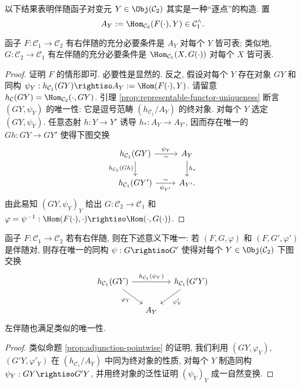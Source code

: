 以下结果表明伴随函子对变元 $Y \in \Obj(\mathcal{C}_2)$ 其实是一种``逐点''的构造. 置
\[ A_Y := \Hom_{\mathcal{C}_2}(F(\cdot), Y) \in \mathcal{C}_1^\wedge. \]

\begin{proposition}\label{prop:adjunction-pointwise}
	函子 $F: \mathcal{C}_1 \to \mathcal{C}_2$ 有右伴随的充分必要条件是 $A_Y$ 对每个 $Y$ 皆可表; 类似地, $G: \mathcal{C}_2 \to \mathcal{C}_1$ 有左伴随的充分必要条件是 $\Hom_{\mathcal{C}_1}(X, G(\cdot))$ 对每个 $X$ 皆可表.
\end{proposition}
\begin{proof}
	证明 $F$ 的情形即可. 必要性是显然的. 反之, 假设对每个 $Y$ 存在对象 $GY$ 和同构 $\psi_Y: h_{\mathcal{C}_1}(GY) \rightiso A_Y := \Hom(F(\cdot), Y)$.  请留意 $h_{\mathcal{C}}(GY) = \Hom_{\mathcal{C}_2}(\cdot, GY)$. 引理 \ref{prop:representable-functor-uniqueness} 断言 $(GY, \psi_Y)$ 的唯一性: 它是逗号范畴 $(h_{\mathcal{C}_1} / A_Y)$ 的终对象. 对每个 $Y$ 选定 $(GY, \psi_Y)$. 任意态射 $h: Y \to Y'$ 诱导 $h_*: A_Y \to A_{Y'}$, 因而存在唯一的 $Gh: GY \to GY'$ 使得下图交换
	\[ \begin{tikzcd}
		h_{\mathcal{C}_1}(GY) \arrow[d, "{h_{\mathcal{C}_1}(Gh)}"'] \arrow[r, "\psi_Y", "\sim"'] & A_Y \arrow[d, "h_*"] \\
		h_{\mathcal{C}_1}(GY') \arrow[r, "{\psi_{Y'}}"', "\sim"] & A_{Y'} .
	\end{tikzcd} \]
	由此易知 $(GY, \psi_Y)_Y$ 给出 $G: \mathcal{C}_2 \to \mathcal{C}_1$ 和 $\varphi = \psi^{-1}: \Hom(F(\cdot), \cdot) \rightiso \Hom(\cdot, G(\cdot))$.
\end{proof}

\begin{proposition}\label{prop:adjunction-uniqueness}
	函子 $F: \mathcal{C}_1 \to \mathcal{C}_2$ 若有右伴随, 则在下述意义下唯一: 若 $(F, G, \varphi)$ 和 $(F, G', \varphi')$ 是伴随对, 则存在唯一的同构 $\psi: G \rightiso G'$ 使得对每个 $Y \in \Obj(\mathcal{C}_2)$ 下图交换
	\[ \begin{tikzcd}[column sep=small]
		h_{\mathcal{C}_1}(GY) \arrow[rr, "{h_{\mathcal{C}_1}(\psi_Y)}"] \arrow[rd, "\varphi_Y"'] & & h_{\mathcal{C}_1}(G'Y) \arrow[ld, "{{\varphi}'_Y}"] \\
		& A_Y &
	\end{tikzcd} \]
	左伴随也满足类似的唯一性.
\end{proposition}
\begin{proof}
	类似命题 \ref{prop:adjunction-pointwise} 的证明, 我们利用 $(GY, \varphi_Y)$, $(G'Y, {\varphi}'_Y)$ 在 $(h_{\mathcal{C}_1} / A_Y)$ 中同为终对象的性质, 对每个 $Y$ 制造同构 $\psi_Y: GY \rightiso G'Y$, 并用终对象的泛性证明 $(\psi_Y)_Y$ 成一自然变换.
\end{proof}

